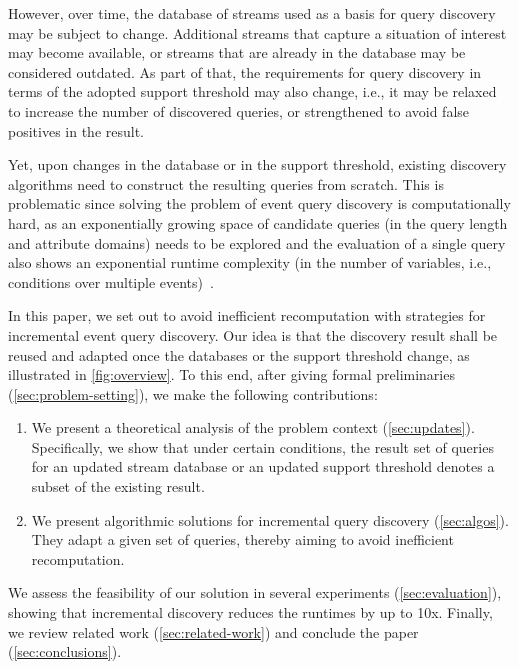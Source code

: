 However, over time, the database of streams used as a
basis for query discovery may be subject to change.
Additional streams that capture a situation of interest
may become available, or streams that are already in the
database may be considered outdated. As part of that, the
requirements for query discovery in terms of the adopted
support threshold may also change, i.e., it may be relaxed
to increase the number of discovered queries, or
strengthened to avoid false positives in the result.

Yet, upon changes in the database or in the support
threshold, existing discovery algorithms need to construct
the resulting queries from scratch. This is problematic
since solving the problem of event query discovery is
computationally hard, as an exponentially growing space of
candidate queries (in the query length and attribute
domains) needs to be explored and the evaluation of a
single query also shows an exponential runtime complexity
(in the number of variables, i.e., conditions over
multiple events)~\cite{icdt2022}.

In this paper, we set out to avoid
inefficient recomputation with strategies for incremental
event query discovery. Our idea is that the discovery
result shall be reused and adapted once the databases or
the support threshold change, as illustrated in
\autoref{fig:overview}. To this end, after giving
formal preliminaries (\autoref{sec:problem-setting}), we
make the following contributions:
\begin{enumerate}[left=.2em,nosep,label=(\roman*)]
\item We present a theoretical analysis of
the problem context (\autoref{sec:updates}).
Specifically, we show that under certain conditions, the
result set of queries for an updated stream database or an
updated support threshold denotes a subset of the existing
result.
\item We present algorithmic
solutions for incremental query discovery
(\autoref{sec:algos}). They adapt a given set of queries,
thereby aiming to avoid inefficient recomputation.
\end{enumerate}
We assess the feasibility of our
solution in several experiments
(\autoref{sec:evaluation}), showing that incremental
discovery reduces the runtimes by up to 10x.
Finally, we review related work
(\autoref{sec:related-work}) and conclude the paper
(\autoref{sec:conclusions}).







